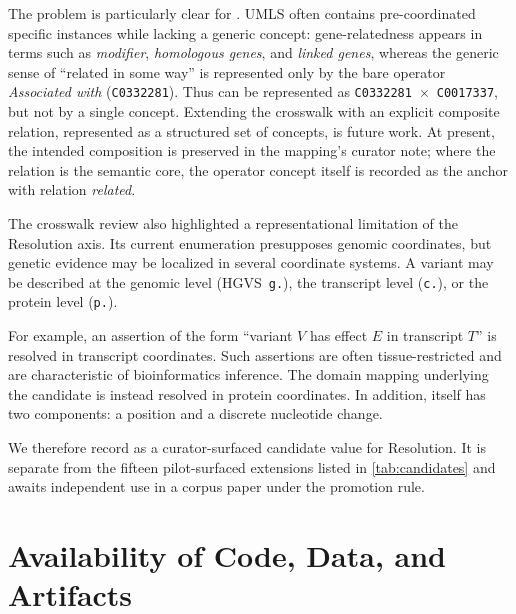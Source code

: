 The problem is particularly clear for . UMLS often
contains pre-coordinated specific instances while lacking a generic concept:
gene-relatedness appears in terms such as \emph{modifier},
\emph{homologous genes}, and \emph{linked genes}, whereas the generic sense
of ``related in some way'' is represented only by the bare operator
\emph{Associated with} (\texttt{C0332281}). Thus
 can be represented as
\texttt{C0332281}~$\times$~\texttt{C0017337}, but not by a single concept.
Extending the crosswalk with an explicit composite relation, represented as
a structured set of concepts, is future work. At present, the intended composition
is preserved in the mapping's curator note; where the relation is the
semantic core, the operator concept itself is recorded as the anchor with
relation \emph{related}.

The crosswalk review also highlighted a representational limitation of the
Resolution axis. Its current enumeration presupposes genomic coordinates, but
genetic evidence may be localized in several coordinate systems. A variant
may be described at the genomic level (HGVS~\texttt{g.}), the transcript
level (\texttt{c.}), or the protein level (\texttt{p.}).

For example, an assertion of the form ``variant $V$ has effect $E$ in
transcript $T$'' is resolved in transcript coordinates. Such assertions are
often tissue-restricted and are characteristic of bioinformatics inference.
The domain mapping underlying the  candidate is
instead resolved in protein coordinates. In addition, 
itself has two components: a position and a discrete nucleotide change.

We therefore record  as a curator-surfaced
candidate value for Resolution. It is separate from the fifteen
pilot-surfaced extensions listed in \cref{tab:candidates} and awaits
independent use in a corpus paper under the promotion rule.

\section{Availability of Code, Data, and Artifacts}
\label{sec:availability}

